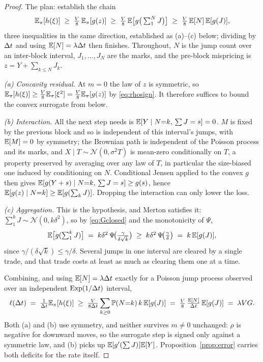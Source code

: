 \begin{proof}
The plan: establish the chain
\[
\mathbb{E}_\pi[h(\xi)] \;\ge\; \tfrac{V}{8}\,\mathbb{E}_\pi[g(z)] \;\ge\; \tfrac{V}{8}\,\mathbb{E}\big[g\big(\textstyle\sum_1^N J\big)\big] \;\ge\; \tfrac{V}{8}\,\mathbb{E}[N]\,\mathbb{E}[g(J)],
\]
three inequalities in the same direction, established as (a)--(c) below; dividing by $\Delta t$ and using $\mathbb{E}[N]=\lambda\Delta t$ then finishes. Throughout, $N$ is the jump count over an inter-block interval, $J_1,\dots,J_N$ are the marks, and the pre-block mispricing is $z = Y + \sum_{k\le N}J_k$.

\emph{(a) Concavity residual.} At $m=0$ the law of $z$ is symmetric, so $\mathbb{E}_\pi[h(\xi)] \ge \tfrac{V}{8}\mathbb{E}_\pi[\xi^2] = \tfrac{V}{8}\mathbb{E}_\pi[g(z)]$ by \eqref{eq:rhosign}. It therefore suffices to bound the convex surrogate from below.

\emph{(b) Interaction.} All the next step needs is $\mathbb{E}[Y\mid N{=}k,\,\sum J = s]=0$. $M$ is fixed by the previous block and so is independent of this interval's jumps, with $\mathbb{E}[M]=0$ by symmetry; the Brownian path is independent of the Poisson process and its marks, and $X\mid T\sim\mathcal N(0,\sigma^2T)$ is mean-zero conditionally on $T$, a property preserved by averaging over any law of $T$, in particular the size-biased one induced by conditioning on $N$. Conditional Jensen applied to the convex $g$ then gives $\mathbb{E}[g(Y+s)\mid N{=}k,\,\sum J = s] \ge g(s)$, hence $\mathbb{E}[g(z)\mid N{=}k] \ge \mathbb{E}[g(\sum_{k}J)]$. Dropping the interaction can only lower the loss.

\emph{(c) Aggregation.} This is the hypothesis, and Merton satisfies it: $\sum_{1}^{k}J \sim \mathcal N(0,k\delta^2)$, so by \eqref{eq:Gclosed} and the monotonicity of $\Psi$,
\[
\mathbb{E}\big[g(\textstyle\sum_1^k J)\big] \;=\; k\delta^2\,\Psi\!\big(\tfrac{\gamma}{\delta\sqrt k}\big) \;\ge\; k\delta^2\,\Psi\!\big(\tfrac{\gamma}{\delta}\big) \;=\; k\,\mathbb{E}[g(J)],
\]
since $\gamma/(\delta\sqrt k)\le\gamma/\delta$. Several jumps in one interval are cleared by a single trade, and that trade costs at least as much as clearing them one at a time.

Combining, and using $\mathbb{E}[N]=\lambda\Delta t$ exactly for a Poisson jump process observed over an independent $\mathrm{Exp}(1/\Delta t)$ interval,
\[
\ell(\Delta t) \;=\; \tfrac{1}{\Delta t}\mathbb{E}_\pi[h(\xi)] \;\ge\; \tfrac{V}{8\Delta t}\sum_{k\ge0}\mathbb{P}(N{=}k)\,k\,\mathbb{E}[g(J)] \;=\; \tfrac{V}{8}\,\tfrac{\mathbb{E}[N]}{\Delta t}\,\mathbb{E}[g(J)] \;=\; \lambda V G .
\]
Both (a) and (b) use symmetry, and neither survives $m\neq0$ unchanged: $\rho$ is negative for downward moves, so the surrogate step is signed only against a symmetric law, and (b) picks up $\mathbb{E}[g'(\sum J)]\mathbb{E}[Y]$. Proposition~\ref{prop:error} carries both deficits for the rate itself.
\end{proof}

